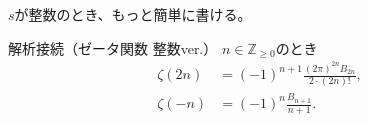 \documentclass[11pt,b5paper,papersize,dvipdfmx]{jsbook}
\begin{document}
$s$が整数のとき、もっと簡単に書ける。
\begin{thm}{解析接続（ゼータ関数 整数ver.）}
  $n \in \mathbb{Z}_{\ge 0}$のとき
  \begin{align}
    \zeta(2n) &= (-1)^{n+1} \frac{(2\pi)^{2n} B_{2n}}{2\cdot (2n)!}, \label{eq:zeta+}\\
    \zeta(-n) &= (-1)^n \frac{B_{n+1}}{n+1}. \label{eq:zeta-}
  \end{align}
\end{thm}

\fi












\end{document}
